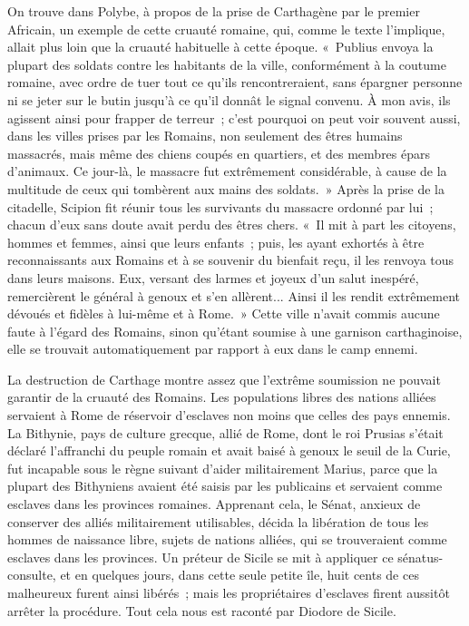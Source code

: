 \documentclass[french,twoside]{book} %
\begin{document}
On trouve dans Polybe, à propos de la prise de Carthagène par le premier Africain, un exemple de cette cruauté romaine, qui, comme le texte l'implique, allait plus loin que la cruauté habituelle à cette époque. « Publius envoya la plupart des soldats contre les habitants de la ville, conformément à la coutume romaine, avec ordre de tuer tout ce qu'ils rencontreraient, sans épargner per­sonne ni se jeter sur le butin jusqu'à ce qu'il donnât le signal convenu. À mon avis, ils agissent ainsi pour frapper de terreur ; c'est pourquoi on peut voir souvent aussi, dans les villes prises par les Romains, non seulement des êtres humains massacrés, mais même des chiens coupés en quartiers, et des membres épars d'animaux. Ce jour-là, le massacre fut extrêmement considé­rable, à cause de la multitude de ceux qui tombèrent aux mains des soldats. » Après la prise de la citadelle, Scipion fit réunir tous les survivants du massacre ordonné par lui ; chacun d'eux sans doute avait perdu des êtres chers. « Il mit à part les citoyens, hommes et femmes, ainsi que leurs enfants ; puis, les ayant exhortés à être reconnaissants aux Romains et à se souvenir du bienfait reçu, il les renvoya tous dans leurs maisons. Eux, versant des larmes et joyeux d'un salut inespéré, remercièrent le général à genoux et s'en allèrent... Ainsi il les rendit extrêmement dévoués et fidèles à lui-même et à Rome. » Cette ville n'avait commis aucune faute à l'égard des Romains, sinon qu'étant soumise à une garnison carthaginoise, elle se trouvait automatiquement par rapport à eux dans le camp ennemi.\par
La destruction de Carthage montre assez que l'extrême soumission ne pouvait garantir de la cruauté des Romains. Les populations libres des nations alliées servaient à Rome de réservoir d'esclaves non moins que celles des pays ennemis. La Bithynie, pays de culture grecque, allié de Rome, dont le roi Prusias s'était déclaré l'affranchi du peuple romain et avait baisé à genoux le seuil de la Curie, fut incapable sous le règne suivant d'aider militairement Marius, parce que la plupart des Bithyniens avaient été saisis par les publi­cains et servaient comme esclaves dans les provinces romaines. Apprenant cela, le Sénat, anxieux de conserver des alliés militairement utilisables, décida la libération de tous les hommes de naissance libre, sujets de nations alliées, qui se trouveraient comme esclaves dans les provinces. Un préteur de Sicile se mit à appliquer ce sénatus-consulte, et en quelques jours, dans cette seule petite île, huit cents de ces malheureux furent ainsi libérés ; mais les proprié­taires d'esclaves firent aussitôt arrêter la procédure. Tout cela nous est raconté par Diodore de Sicile.\par
\end{document}
